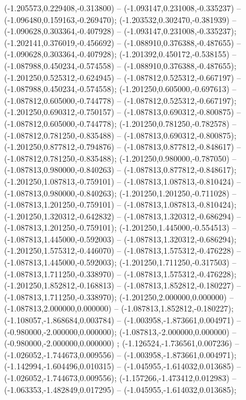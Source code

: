  (-1.205573,0.229408,-0.313800) -- (-1.093147,0.231008,-0.335237) -- (-1.096480,0.159163,-0.269470);
 (-1.203532,0.302470,-0.381939) -- (-1.090628,0.303364,-0.407928) -- (-1.093147,0.231008,-0.335237);
 (-1.202141,0.376019,-0.456692) -- (-1.088910,0.376388,-0.487655) -- (-1.090628,0.303364,-0.407928);
 (-1.201392,0.450172,-0.538155) -- (-1.087988,0.450234,-0.574558) -- (-1.088910,0.376388,-0.487655);
 (-1.201250,0.525312,-0.624945) -- (-1.087812,0.525312,-0.667197) -- (-1.087988,0.450234,-0.574558);
 (-1.201250,0.605000,-0.697613) -- (-1.087812,0.605000,-0.744778) -- (-1.087812,0.525312,-0.667197);
 (-1.201250,0.690312,-0.750157) -- (-1.087813,0.690312,-0.800875) -- (-1.087812,0.605000,-0.744778);
 (-1.201250,0.781250,-0.782578) -- (-1.087812,0.781250,-0.835488) -- (-1.087813,0.690312,-0.800875);
 (-1.201250,0.877812,-0.794876) -- (-1.087813,0.877812,-0.848617) -- (-1.087812,0.781250,-0.835488);
 (-1.201250,0.980000,-0.787050) -- (-1.087813,0.980000,-0.840263) -- (-1.087813,0.877812,-0.848617);
 (-1.201250,1.087813,-0.759101) -- (-1.087813,1.087813,-0.810424) -- (-1.087813,0.980000,-0.840263);
 (-1.201250,1.201250,-0.711028) -- (-1.087813,1.201250,-0.759101) -- (-1.087813,1.087813,-0.810424);
 (-1.201250,1.320312,-0.642832) -- (-1.087813,1.320312,-0.686294) -- (-1.087813,1.201250,-0.759101);
 (-1.201250,1.445000,-0.554513) -- (-1.087813,1.445000,-0.592003) -- (-1.087813,1.320312,-0.686294);
 (-1.201250,1.575312,-0.446070) -- (-1.087813,1.575312,-0.476228) -- (-1.087813,1.445000,-0.592003);
 (-1.201250,1.711250,-0.317503) -- (-1.087813,1.711250,-0.338970) -- (-1.087813,1.575312,-0.476228);
 (-1.201250,1.852812,-0.168813) -- (-1.087813,1.852812,-0.180227) -- (-1.087813,1.711250,-0.338970);
 (-1.201250,2.000000,0.000000) -- (-1.087813,2.000000,0.000000) -- (-1.087813,1.852812,-0.180227);
 (-1.108057,-1.868684,0.003784) -- (-1.003958,-1.873661,0.004971) -- (-0.980000,-2.000000,0.000000);
 (-1.087813,-2.000000,0.000000) -- (-0.980000,-2.000000,0.000000) ;
 (-1.126524,-1.736561,0.007236) -- (-1.026052,-1.744673,0.009556) -- (-1.003958,-1.873661,0.004971);
 (-1.142994,-1.604496,0.010315) -- (-1.045955,-1.614032,0.013685) -- (-1.026052,-1.744673,0.009556);
 (-1.157266,-1.473412,0.012983) -- (-1.063353,-1.482849,0.017295) -- (-1.045955,-1.614032,0.013685);
